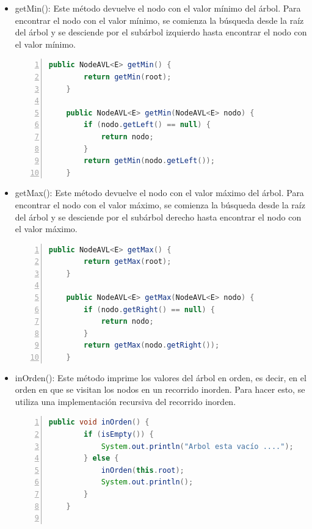 \documentclass{article}
\begin{document}
\begin{itemize}
\begin{lstlisting}[language=Java, caption=Método remove(E x), numbers=left]
    }
                            \end{lstlisting}
                    \item getMin(): Este método devuelve el nodo con el valor mínimo del árbol. Para encontrar el nodo con el valor mínimo, se comienza la búsqueda desde la raíz del árbol y se desciende por el subárbol izquierdo hasta encontrar el nodo con el valor mínimo.
                            \begin{lstlisting}[language=Java, caption=Método getMin(), numbers=left]
    public NodeAVL<E> getMin() {
        return getMin(root);
    }
    
    public NodeAVL<E> getMin(NodeAVL<E> nodo) {
        if (nodo.getLeft() == null) {
            return nodo;
        }
        return getMin(nodo.getLeft());
    }
                            \end{lstlisting}
                    \item getMax(): Este método devuelve el nodo con el valor máximo del árbol. Para encontrar el nodo con el valor máximo, se comienza la búsqueda desde la raíz del árbol y se desciende por el subárbol derecho hasta encontrar el nodo con el valor máximo.
                            \begin{lstlisting}[language=Java, caption=Método getMax(), numbers=left]
    public NodeAVL<E> getMax() {
        return getMax(root);
    }
    
    public NodeAVL<E> getMax(NodeAVL<E> nodo) {
        if (nodo.getRight() == null) {
            return nodo;
        }
        return getMax(nodo.getRight());
    }
                            \end{lstlisting}
                    \item inOrden(): Este método imprime los valores del árbol en orden, es decir, en el orden en que se visitan los nodos en un recorrido inorden. Para hacer esto, se utiliza una implementación recursiva del recorrido inorden.
                            \begin{lstlisting}[language=Java, caption=Método inOrden(), numbers=left]
    public void inOrden() {
        if (isEmpty()) {
            System.out.println("Arbol esta vacío ....");
        } else {
            inOrden(this.root);
            System.out.println();
        }
    }
    

\end{lstlisting}
\end{itemize}
\end{document}
